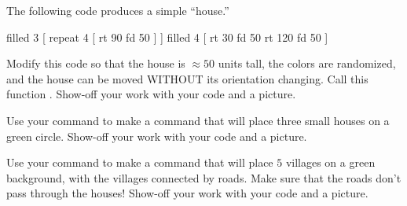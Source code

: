 \documentclass[noauthor,nooutcomes,12pt]{ximera}
\begin{document}
\newpage


\begin{problem}
  The following code produces a simple ``house.''
\begin{logo}
filled 3 [ repeat 4 [ rt 90 fd 50 ] ]
filled 4 [ rt 30 fd 50 rt 120 fd 50 ]
\end{logo}
Modify this code so that the house is $\approx 50$ units tall, the
colors are randomized, and the house can be moved WITHOUT its
orientation changing. Call this function . Show-off your
work with your code and a picture.
\end{problem}

\newpage

\begin{problem}
  Use your command  to make a command  that will
  place three small houses on a green circle. Show-off your work with
  your code and a picture.
\end{problem}

\newpage

\begin{problem}
  Use your command  to make a command  that
  will place $5$ villages on a green background, with the villages
  connected by roads. Make sure that the roads don't pass through the
  houses! Show-off your work with your code and a picture.
\end{problem}
\end{document}
